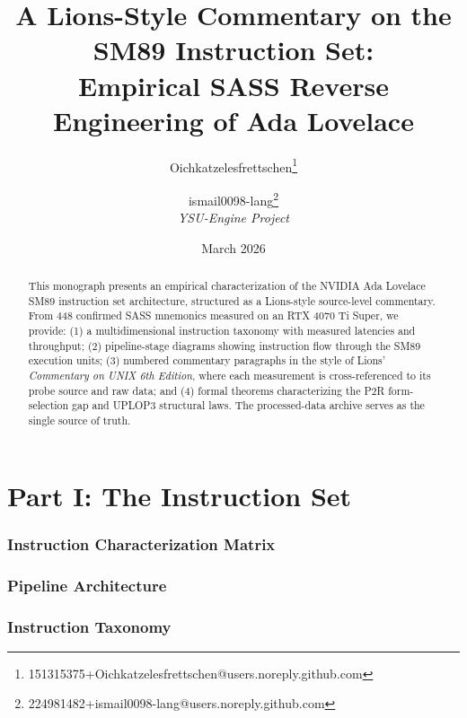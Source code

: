 \documentclass[11pt]{article}
\title{A Lions-Style Commentary on the SM89 Instruction Set:\\
  Empirical SASS Reverse Engineering of Ada Lovelace}
\author{%
  Oichkatzelesfrettschen\thanks{151315375+Oichkatzelesfrettschen@users.noreply.github.com}
  \and
  ismail0098-lang\thanks{224981482+ismail0098-lang@users.noreply.github.com}
  \\[4pt]
  \normalsize\textit{YSU-Engine Project}
}
\date{March 2026}
\begin{document}
\maketitle

\begin{abstract}
This monograph presents an empirical characterization of the NVIDIA Ada Lovelace
SM89 instruction set architecture, structured as a Lions-style source-level
commentary.  From 448 confirmed SASS mnemonics measured on an RTX 4070 Ti Super,
we provide: (1) a multidimensional instruction taxonomy with measured latencies
and throughput; (2) pipeline-stage diagrams showing instruction flow through the
SM89 execution units; (3) numbered commentary paragraphs in the style of Lions'
\textit{Commentary on UNIX 6th Edition}, where each measurement is
cross-referenced to its probe source and raw data; and (4) formal theorems
characterizing the P2R form-selection gap and UPLOP3 structural laws.
The processed-data archive serves as the single source of truth.
\end{abstract}

\tableofcontents
\clearpage


\part*{Part I: The Instruction Set}

\section{Instruction Characterization Matrix}


\section{Pipeline Architecture}
\label{fig:pipeline}


\section{Instruction Taxonomy}




\clearpage
\end{document}

